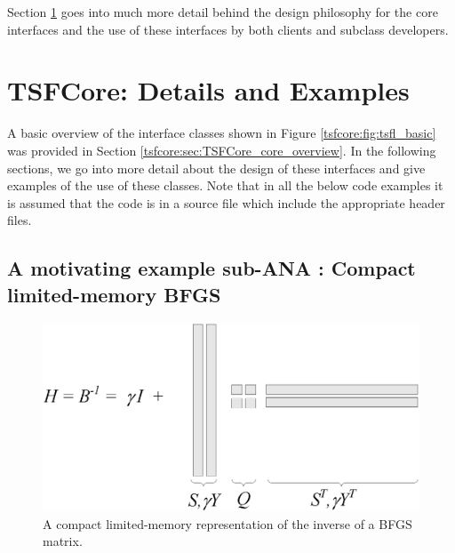 Section {}\ref{tsfcore:sec:TSFCore_Details} goes into much more detail
behind the design philosophy for the core interfaces and the use of
these interfaces by both clients and subclass developers.

%
\section{TSFCore: Details and Examples}
\label{tsfcore:sec:TSFCore_Details}
%

A basic overview of the interface classes shown in Figure
{}\ref{tsfcore:fig:tsfl_basic} was provided in Section
{}\ref{tsfcore:sec:TSFCore_core_overview}.  In the following sections,
we go into more detail about the design of these interfaces and give
examples of the use of these classes.  Note that in all the below code
examples it is assumed that the code is in a source file which include
the appropriate header files.

%
\subsection{A motivating example sub-ANA : Compact limited-memory BFGS}
\label{tsfcore:sec:LBFGS}
%

{\bsinglespace
\begin{figure}[t]
\begin{center}
\includegraphics*[angle=0,scale=0.60]{LBFGS}
\end{center}
\caption{
\label{tsfcore:fig:LBFGS}
A compact limited-memory representation of the inverse of a BFGS matrix.
}
\end{figure}
\esinglespace}

